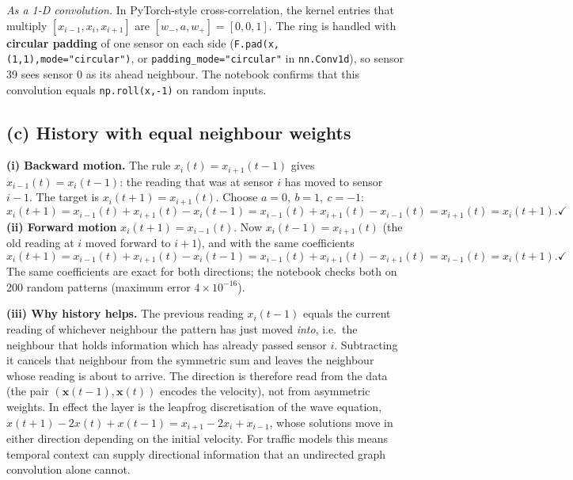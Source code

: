 \emph{As a 1-D convolution.} In PyTorch-style cross-correlation, the kernel entries that multiply
$[x_{i-1},x_i,x_{i+1}]$ are $[w_-,a,w_+]=[0,0,1]$. The ring is handled with \textbf{circular padding} of one
sensor on each side (\texttt{F.pad(x,(1,1),mode="circular")}, or \texttt{padding\_mode="circular"} in
\texttt{nn.Conv1d}), so sensor 39 sees sensor 0 as its ahead neighbour. The notebook confirms that this
convolution equals \texttt{np.roll(x,-1)} on random inputs.

\subsection*{(c) History with equal neighbour weights}
\textbf{(i) Backward motion.} The rule $x_i(t)=x_{i+1}(t-1)$ gives $x_{i-1}(t)=x_i(t-1)$: the reading that was at
sensor $i$ has moved to sensor $i-1$. The target is $x_i(t+1)=x_{i+1}(t)$. Choose $a=0,\ b=1,\ c=-1$:
\[
  \hat x_i(t+1)=x_{i-1}(t)+x_{i+1}(t)-x_i(t-1)=x_{i-1}(t)+x_{i+1}(t)-x_{i-1}(t)=x_{i+1}(t)=x_i(t+1). \checkmark
\]
\textbf{(ii) Forward motion} $x_i(t+1)=x_{i-1}(t)$. Now $x_i(t-1)=x_{i+1}(t)$ (the old reading at $i$ moved
forward to $i+1$), and with the same coefficients
\[
  \hat x_i(t+1)=x_{i-1}(t)+x_{i+1}(t)-x_i(t-1)=x_{i-1}(t)+x_{i+1}(t)-x_{i+1}(t)=x_{i-1}(t)=x_i(t+1). \checkmark
\]
The same coefficients are exact for both directions; the notebook checks both on 200 random patterns
(maximum error $4\times10^{-16}$).

\textbf{(iii) Why history helps.} The previous reading $x_i(t-1)$ equals the current reading of whichever
neighbour the pattern has just moved \emph{into}, i.e.\ the neighbour that holds information which has already
passed sensor $i$. Subtracting it cancels that neighbour from the symmetric sum and leaves the neighbour whose
reading is about to arrive. The direction is therefore read from the data (the pair
$(\mathbf x(t-1),\mathbf x(t))$ encodes the velocity), not from asymmetric weights. In effect the layer is the
leapfrog discretisation of the wave equation, $x(t+1)-2x(t)+x(t-1)=x_{i+1}-2x_i+x_{i-1}$, whose solutions move
in either direction depending on the initial velocity. For traffic models this means temporal context can
supply directional information that an undirected graph convolution alone cannot.
